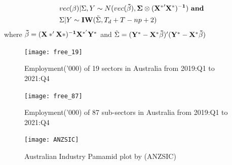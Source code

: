 \documentclass[11pt,a4paper,]{article}
\begin{document}
\[
\begin{aligned}
&vec(\mathbf{\beta})|\Sigma,Y\sim N(vec(\bf{\tilde\beta}),\Sigma\otimes(\bf{X^*}'\bf{X^*})^{-1})\ and\\
&\Sigma|Y\sim\mathbf{IW}(\tilde\Sigma,T_d+T-np+2)
\end{aligned}
\] where \(\bf{\tilde\beta} =(X*'X*)^{-1}X^{*'}Y^*\) and \(\tilde\Sigma=(\bf{Y^*}-\bf{X^*}\bf{\tilde\beta})'(\bf{Y^*}-\bf{X^*}\bf{\tilde\beta})\)

\newpage

\begin{figure}[t]
\texttt{[image: free\_19]}
\centering
\caption{Employment('000) of 19 sectors in Australia from 2019:Q1 to 2021:Q4}
\label{fig:19}
\end{figure}

\begin{figure}[t]
\texttt{[image: free\_87]}
\centering
\caption{Employment('000) of 87 sub-sectors in Australia from 2019:Q1 to 2021:Q4}
\label{fig:87}
\end{figure}

\begin{figure}[t]
\texttt{[image: ANZSIC]}
\centering
\caption{Australian Industry Pamamid plot by (ANZSIC)}
\label{fig:anzsic}
\end{figure}

\clearpage

\printbibliography
\end{document}
